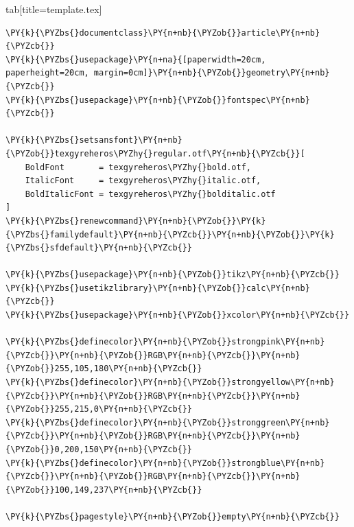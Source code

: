 \documentclass[a4paper,twoside]{article}
\begin{document}
\begin{tsdiv}{tab}[title=template.tex]
\begin{tscode}[lang=tex, engine=pygments]
\begin{Verbatim}[commandchars=\\\{\},breaklines, breakanywhere, commandchars=\\\{\}]
\PY{k}{\PYZbs{}documentclass}\PY{n+nb}{\PYZob{}}article\PY{n+nb}{\PYZcb{}}
\PY{k}{\PYZbs{}usepackage}\PY{n+na}{[paperwidth=20cm, paperheight=20cm, margin=0cm]}\PY{n+nb}{\PYZob{}}geometry\PY{n+nb}{\PYZcb{}}
\PY{k}{\PYZbs{}usepackage}\PY{n+nb}{\PYZob{}}fontspec\PY{n+nb}{\PYZcb{}}

\PY{k}{\PYZbs{}setsansfont}\PY{n+nb}{\PYZob{}}texgyreheros\PYZhy{}regular.otf\PY{n+nb}{\PYZcb{}}[
    BoldFont       = texgyreheros\PYZhy{}bold.otf,
    ItalicFont     = texgyreheros\PYZhy{}italic.otf,
    BoldItalicFont = texgyreheros\PYZhy{}bolditalic.otf
]
\PY{k}{\PYZbs{}renewcommand}\PY{n+nb}{\PYZob{}}\PY{k}{\PYZbs{}familydefault}\PY{n+nb}{\PYZcb{}}\PY{n+nb}{\PYZob{}}\PY{k}{\PYZbs{}sfdefault}\PY{n+nb}{\PYZcb{}}

\PY{k}{\PYZbs{}usepackage}\PY{n+nb}{\PYZob{}}tikz\PY{n+nb}{\PYZcb{}}
\PY{k}{\PYZbs{}usetikzlibrary}\PY{n+nb}{\PYZob{}}calc\PY{n+nb}{\PYZcb{}}
\PY{k}{\PYZbs{}usepackage}\PY{n+nb}{\PYZob{}}xcolor\PY{n+nb}{\PYZcb{}}

\PY{k}{\PYZbs{}definecolor}\PY{n+nb}{\PYZob{}}strongpink\PY{n+nb}{\PYZcb{}}\PY{n+nb}{\PYZob{}}RGB\PY{n+nb}{\PYZcb{}}\PY{n+nb}{\PYZob{}}255,105,180\PY{n+nb}{\PYZcb{}}
\PY{k}{\PYZbs{}definecolor}\PY{n+nb}{\PYZob{}}strongyellow\PY{n+nb}{\PYZcb{}}\PY{n+nb}{\PYZob{}}RGB\PY{n+nb}{\PYZcb{}}\PY{n+nb}{\PYZob{}}255,215,0\PY{n+nb}{\PYZcb{}}
\PY{k}{\PYZbs{}definecolor}\PY{n+nb}{\PYZob{}}stronggreen\PY{n+nb}{\PYZcb{}}\PY{n+nb}{\PYZob{}}RGB\PY{n+nb}{\PYZcb{}}\PY{n+nb}{\PYZob{}}0,200,150\PY{n+nb}{\PYZcb{}}
\PY{k}{\PYZbs{}definecolor}\PY{n+nb}{\PYZob{}}strongblue\PY{n+nb}{\PYZcb{}}\PY{n+nb}{\PYZob{}}RGB\PY{n+nb}{\PYZcb{}}\PY{n+nb}{\PYZob{}}100,149,237\PY{n+nb}{\PYZcb{}}

\PY{k}{\PYZbs{}pagestyle}\PY{n+nb}{\PYZob{}}empty\PY{n+nb}{\PYZcb{}}


\end{Verbatim}
\end{tscode}
\end{tsdiv}
\end{document}
